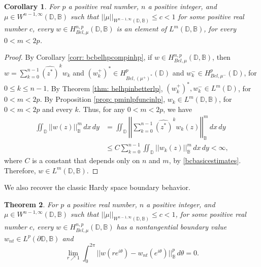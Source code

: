 \documentclass[12pt,reqno]{amsart}
\newtheorem{theorem}{Theorem}[section]
\newtheorem{corr}[theorem]{Corollary}
\theoremstyle{definition}
\theoremstyle{remark}
\newcommand{\p}{\partial}
\newcommand{\bc}{\mathbb{B}}
\newcommand{\disk}{\mathbb{D}}
\begin{document}
\begin{corr}
    For $p$ a positive real number, $n$ a positive integer, and $\mu \in W^{n-1,\infty}(\disk,\bc)$ such that $||\mu||_{W^{n-1,\infty}(\disk,\bc)}\leq c < 1$ for some positive real number $c$, every $w \in H^{n,p}_{Bel,\mu}(\disk,\bc)$ is an element of $L^m(\disk,\bc)$, for every $0 < m < 2p$. 
\end{corr}

\begin{proof}
    By Corollary \ref{corr: bcbelhpcompinhp}, if $w \in H^{n,p}_{Bel,\mu}(\disk,\bc)$, then $w = \sum_{k=0}^{n-1} \widehat{ (z^*)}^k w_k$ and $(w_k^+)^* \in H^p_{Bel,(\mu^+)^*}(\disk)$ and $w^-_k \in H^p_{Bel,\mu^-}(\disk)$, for $0 \leq k \leq n-1$. By Theorem \ref{thm: belhpinbetterlp}, $(w^+_k)^*, w^-_k \in L^m(\disk)$, for $0 < m < 2p$. By Proposition \ref{prop: pminlpfuncinlp}, $w_k \in L^m(\disk, \bc)$, for $0 < m < 2p$ and every 
    $k$. Thus, for any $0 < m < 2p$, we have 
    \begin{align*}
        \iint_{\disk} ||w(z)||_\bc^m \,dx\,dy
        &= \iint_{\disk} \left|\left|\sum_{k=0}^{n-1} \widehat{ (z^*)}^k w_k(z) \right|\right|_\bc^m \,dx\,dy\\
        &\leq C \sum_{k=0}^{n-1} \iint_{\disk} ||w_k(z)||_\bc^m\,dx\,dy < \infty,
    \end{align*}
    where $C$ is a constant that depends only on $n$ and $m$, by \eqref{bcbasicestimates}. Therefore, $w \in L^m(\disk,\bc)$.
\end{proof}

We also recover the classic Hardy space boundary behavior. 



\begin{theorem}\label{thm: bcbelbvcon}
For $p$ a positive real number, $n$ a positive integer, and $\mu \in W^{n-1,\infty}(\disk,\bc)$ such that $||\mu||_{W^{n-1,\infty}(\disk,\bc)}\leq c < 1$, for some positive real number $c$, every $w \in H^{n,p}_{Bel,\mu}(\disk,\bc)$ has a nontangential boundary value $w_{nt} \in L^p(\p \disk,\bc)$ and 
\[
    \lim_{r\nearrow 1} \int_0^{2\pi} ||w(re^{i\theta})- w_{nt}(e^{i\theta})||_{\bc}^p\,d\theta = 0.
\]

\end{theorem}
\end{document}
